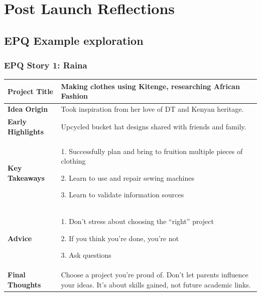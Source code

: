 \section{Post Launch Reflections}
\label{sec:PostLaunchReflections}
\subsection{EPQ Example exploration}
\subsubsection*{EPQ Story 1: Raina}



\begin{tabularx}{\textwidth}{@{}lX@{}}
    \toprule
    \textbf{Project Title}    & Making clothes using Kitenge, researching African Fashion                                                                      \\
    \midrule
    \textbf{Idea Origin}      & Took inspiration from her love of DT and Kenyan heritage.                                                                      \\
    \textbf{Early Highlights} & Upcycled bucket hat designs shared with friends and family.                                                                    \\
    \textbf{Key Takeaways}    &
    1. Successfully plan and bring to fruition multiple pieces of clothing

    2. Learn to use and repair sewing machines

    3. Learn to validate information sources                                                                                                                   \\
    \textbf{Advice}           &

    1. Don't stress about choosing the “right” project

    2. If you think you're done, you're not

    3. Ask questions                                                                                                                                           \\

    \textbf{Final Thoughts}   & Choose a project you're proud of. Don't let parents influence your ideas. It's about skills gained, not future academic links. \\
    \bottomrule
\end{tabularx}


